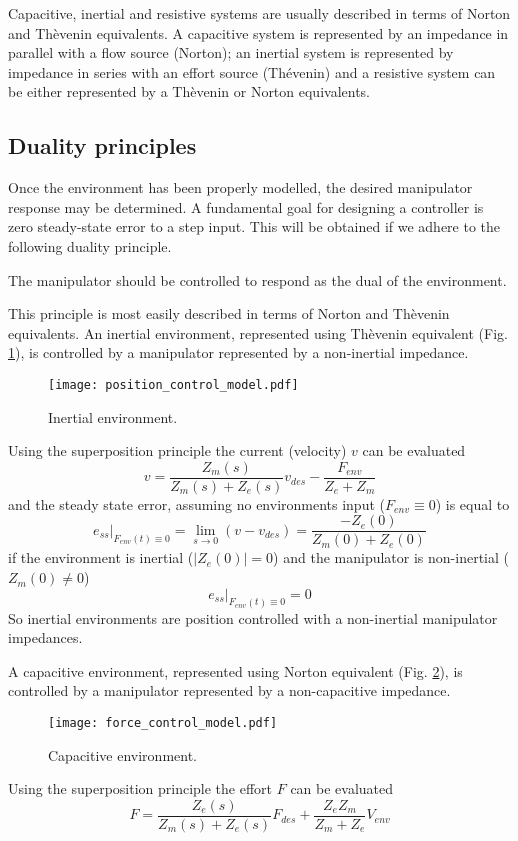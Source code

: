 Capacitive, inertial and resistive systems are usually described in terms of 
Norton and Thèvenin equivalents. A capacitive system is 
represented by an impedance in parallel with a flow source (Norton); 
an inertial system is represented by impedance in series with an 
effort source (Thévenin) and a resistive system 
can be either represented by a Thèvenin or Norton equivalents.

\subsection{Duality principles}
Once the environment has been properly modelled, the 
desired manipulator response may be determined. A fundamental goal for 
designing a controller is zero steady-state error to a step 
input. This will be obtained if we adhere to the 
following duality principle.
\begin{theorem}
  The manipulator should be controlled to respond as the dual of the environment.
\end{theorem}
This principle is most easily described in terms of Norton and Thèvenin equivalents.
An inertial environment, represented using Thèvenin equivalent (Fig. \ref{fig:position_control_model}), is controlled by a manipulator represented by a non-inertial impedance.
\begin{figure}[h]
  \centering
  \texttt{[image: position\_control\_model.pdf]}
  \caption{Inertial environment. \label{fig:position_control_model}}
\end{figure}
Using the superposition principle the current (velocity) $v$ can be evaluated
\begin{equation}
  \label{eq:position_control_circuit}
  v = \frac{Z_m(s)}{Z_m(s) + Z_e(s)}v_{des} - 		\frac{F_{env}}{Z_e + Z_m}
\end{equation}
and the steady state error, assuming no environments input ($F_{env} \equiv 0$) is equal to 
\[
e_{ss} \Big|_{F_{env}(t) \equiv 0} = \lim_{s \to 0}(v - v_{des}) = \frac{-Z_e(0)}{Z_m(0) + Z_e(0)}
\]
if the environment is inertial ($|Z_e(0)| = 0$) and the manipulator is non-inertial ($Z_m(0) \neq 0$) 
\[
e_{ss} \Big|_{F_{env}(t) \equiv 0} = 0
\]
So inertial environments are position controlled with a non-inertial manipulator impedances.

A capacitive environment, represented using Norton equivalent (Fig. \ref{fig:force_control_model}), 
is controlled by a manipulator represented by a 
non-capacitive impedance.
\begin{figure}[h]
  \centering
  \texttt{[image: force\_control\_model.pdf]}
  \caption{Capacitive environment. \label{fig:force_control_model}}
\end{figure}
Using the superposition principle the effort $F$ can be evaluated
\begin{equation}
  \label{eq:force_control_circuit}
  F = \frac{Z_e(s)}{Z_m(s) + Z_e(s)}F_{des} + \frac{Z_e Z_m}{Z_m + Z_e} V_{env}
\end{equation}

